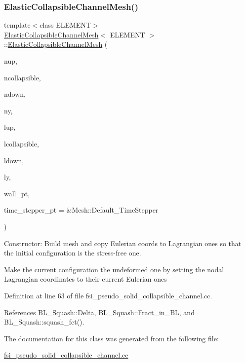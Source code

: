 \subsubsection{\texorpdfstring{Elastic\+Collapsible\+Channel\+Mesh()}{ElasticCollapsibleChannelMesh()}}
{\footnotesize\ttfamily template$<$class E\+L\+E\+M\+E\+NT$>$ \\
\hyperlink{classElasticCollapsibleChannelMesh}{Elastic\+Collapsible\+Channel\+Mesh}$<$ E\+L\+E\+M\+E\+NT $>$\+::\hyperlink{classElasticCollapsibleChannelMesh}{Elastic\+Collapsible\+Channel\+Mesh} (\begin{DoxyParamCaption}\item[{const unsigned \&}]{nup,  }\item[{const unsigned \&}]{ncollapsible,  }\item[{const unsigned \&}]{ndown,  }\item[{const unsigned \&}]{ny,  }\item[{const double \&}]{lup,  }\item[{const double \&}]{lcollapsible,  }\item[{const double \&}]{ldown,  }\item[{const double \&}]{ly,  }\item[{Geom\+Object $\ast$}]{wall\+\_\+pt,  }\item[{Time\+Stepper $\ast$}]{time\+\_\+stepper\+\_\+pt = {\ttfamily \&Mesh\+:\+:Default\+\_\+TimeStepper} }\end{DoxyParamCaption})\hspace{0.3cm}{\ttfamily [inline]}}



Constructor\+: Build mesh and copy Eulerian coords to Lagrangian ones so that the initial configuration is the stress-\/free one. 

Make the current configuration the undeformed one by setting the nodal Lagrangian coordinates to their current Eulerian ones 

Definition at line 63 of file fsi\+\_\+pseudo\+\_\+solid\+\_\+collapsible\+\_\+channel.\+cc.



References B\+L\+\_\+\+Squash\+::\+Delta, B\+L\+\_\+\+Squash\+::\+Fract\+\_\+in\+\_\+\+BL, and B\+L\+\_\+\+Squash\+::squash\+\_\+fct().



The documentation for this class was generated from the following file\+:\begin{DoxyCompactItemize}
\item 
\hyperlink{fsi__pseudo__solid__collapsible__channel_8cc}{fsi\+\_\+pseudo\+\_\+solid\+\_\+collapsible\+\_\+channel.\+cc}\end{DoxyCompactItemize}

